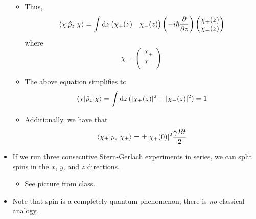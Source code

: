 \documentclass[../notes.tex]{subfiles}
\begin{document}
\begin{itemize}
\begin{itemize}
        \item Thus,
        \begin{equation*}
            \ev{\hat{p}_z}{\chi} = \int\dd{z}
            \begin{pmatrix}
                \chi_+(z) & \chi_-(z)\\
            \end{pmatrix}
            \left( -i\hbar\pdv{z} \right)
            \begin{pmatrix}
                \chi_+(z)\\
                \chi_-(z)\\
            \end{pmatrix}
        \end{equation*}
        where
        \begin{equation*}
            \chi =
            \begin{pmatrix}
                \chi_+\\
                \chi_-\\
            \end{pmatrix}
        \end{equation*}
        \item The above equation simplifies to
        \begin{equation*}
            \ev{\hat{p}_z}{\chi} = \int\dd{z}(|\chi_+(z)|^2+|\chi_-(z)|^2)
            = 1
        \end{equation*}
        \item Additionally, we have that
        \begin{equation*}
            \ev{p_z}{\chi_\pm} = \pm|\chi_+(0)|^2\frac{\gamma Bt}{2}
        \end{equation*}
    \end{itemize}
    \item If we run three consecutive Stern-Gerlach experiments in series, we can split spins in the $x$, $y$, and $z$ directions.
    \begin{itemize}
        \item See picture from class.
    \end{itemize}
    \item Note that spin is a completely quantum phenomenon; there is \emph{no} classical analogy.
\end{itemize}
\end{document}
